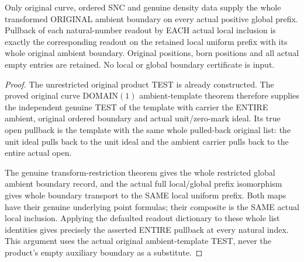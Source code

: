 \begin{theorem}
\label{hir:sharp-actual-curve-global-prefix-ambient-boundary-local-readouts}
\leanok
Only original curve, ordered SNC and genuine density data supply the
whole transformed ORIGINAL ambient boundary on every actual positive
global prefix. Pullback of each natural-number readout by EACH actual
local inclusion is exactly the corresponding readout on the retained
local uniform prefix with its whole original ambient boundary. Original
positions, born positions and all actual empty entries are retained. No
local or global boundary certificate is input.
\end{theorem}
\begin{proof}
The unrestricted original product TEST is already constructed. The proved
original curve DOMAIN$(1)$ ambient-template theorem therefore supplies the
independent genuine TEST of the template with carrier the ENTIRE ambient,
original ordered boundary and actual unit/zero-mark ideal. Its true open
pullback is the template with the same whole pulled-back original list:
the unit ideal pulls back to the unit ideal and the ambient carrier pulls
back to the entire actual open.

The genuine transform-restriction theorem gives the whole restricted
global ambient boundary record, and the actual full local/global prefix
isomorphism gives whole boundary transport to the SAME local uniform
prefix. Both maps have their genuine underlying point formulas; their
composite is the SAME actual local inclusion. Applying the defaulted
readout dictionary to these whole list identities gives precisely the
asserted ENTIRE pullback at every natural index. This argument uses the
actual original ambient-template TEST, never the product's empty auxiliary
boundary as a substitute.
\end{proof}

